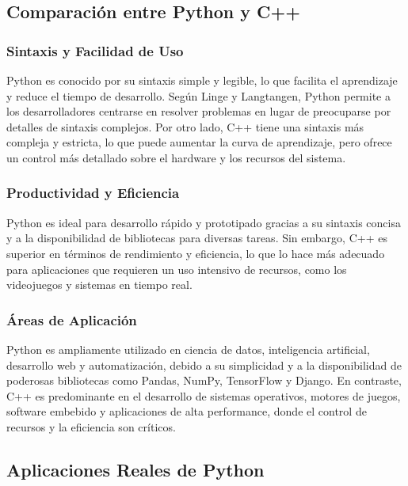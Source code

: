 \documentclass[12pt]{article}
\begin{document}
	\subsection{Comparación entre Python y C++}
	
	\subsubsection{Sintaxis y Facilidad de Uso}
	
	Python es conocido por su sintaxis simple y legible, lo que facilita el aprendizaje y reduce el tiempo de desarrollo. Según Linge y Langtangen, Python permite a los desarrolladores centrarse en resolver problemas en lugar de preocuparse por detalles de sintaxis complejos. Por otro lado, C++ tiene una sintaxis más compleja y estricta, lo que puede aumentar la curva de aprendizaje, pero ofrece un control más detallado sobre el hardware y los recursos del sistema.
	
	\subsubsection{Productividad y Eficiencia}
	
	Python es ideal para desarrollo rápido y prototipado gracias a su sintaxis concisa y a la disponibilidad de bibliotecas para diversas tareas. Sin embargo, C++ es superior en términos de rendimiento y eficiencia, lo que lo hace más adecuado para aplicaciones que requieren un uso intensivo de recursos, como los videojuegos y sistemas en tiempo real.
	
	\subsubsection{Áreas de Aplicación}
	
	Python es ampliamente utilizado en ciencia de datos, inteligencia artificial, desarrollo web y automatización, debido a su simplicidad y a la disponibilidad de poderosas bibliotecas como Pandas, NumPy, TensorFlow y Django. En contraste, C++ es predominante en el desarrollo de sistemas operativos, motores de juegos, software embebido y aplicaciones de alta performance, donde el control de recursos y la eficiencia son críticos.
	
	\subsection{Aplicaciones Reales de Python}
	
\end{document}
